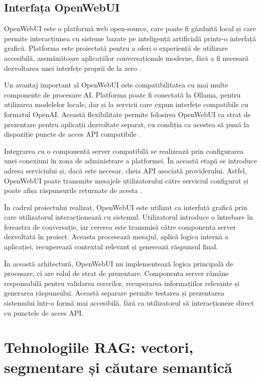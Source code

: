 \documentclass[12pt, a4paper, oneside, romanian]{teza-upb}
\begin{document}
\subsection{Interfața OpenWebUI}

OpenWebUI este o platformă web open-source, care poate fi găzduită local și care permite interacțiunea cu sisteme bazate pe inteligență artificială printr-o interfață grafică. Platforma este proiectată pentru a oferi o experiență de utilizare accesibilă, asemănătoare aplicațiilor conversaționale moderne, fără a fi necesară dezvoltarea unei interfețe proprii de la zero \cite{openwebui_doc}.

Un avantaj important al OpenWebUI este compatibilitatea cu mai multe componente de procesare AI. Platforma poate fi conectată la Ollama, pentru utilizarea modelelor locale, dar și la servicii care expun interfețe compatibile cu formatul OpenAI. Această flexibilitate permite folosirea OpenWebUI ca strat de prezentare pentru aplicații dezvoltate separat, cu condiția ca acestea să pună la dispoziție puncte de acces API compatibile \cite{openwebui_doc}.

Integrarea cu o componentă server compatibilă se realizează prin configurarea unei conexiuni în zona de administrare a platformei. În această etapă se introduce adresa serviciului și, dacă este necesar, cheia API asociată providerului. Astfel, OpenWebUI poate transmite mesajele utilizatorului către serviciul configurat și poate afișa răspunsurile returnate de acesta \cite{openwebui_openai_compatible}.

În cadrul proiectului realizat, OpenWebUI este utilizat ca interfață grafică prin care utilizatorul interacționează cu sistemul. Utilizatorul introduce o întrebare în fereastra de conversație, iar cererea este transmisă către componenta server dezvoltată în proiect. Aceasta procesează mesajul, aplică logica internă a aplicației, recuperează contextul relevant și generează răspunsul final.

În această arhitectură, OpenWebUI nu implementează logica principală de procesare, ci are rolul de strat de prezentare. Componenta server rămâne responsabilă pentru validarea cererilor, recuperarea informațiilor relevante și generarea răspunsului. Această separare permite testarea și prezentarea sistemului într-o formă mai accesibilă, fără ca utilizatorul să interacționeze direct cu punctele de acces API.




\section{Tehnologiile RAG: vectori, segmentare și căutare semantică}
\end{document}
